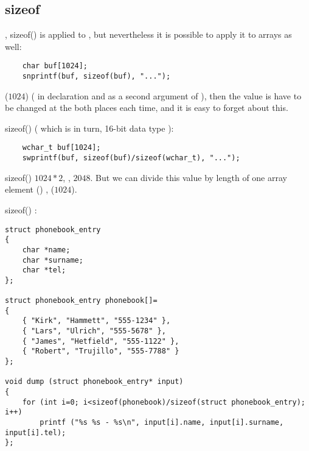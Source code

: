 ﻿\subsection{sizeof}

, sizeof() 
{is applied to }
,
{but nevertheless it is possible to apply it to arrays as well}:

\begin{lstlisting}
	char buf[1024];
	snprintf(buf, sizeof(buf), "...");
\end{lstlisting}

 ($1024$) 
(
{in  declaration and as a second argument of }),
{then the value is have to be changed at the both places each time, and it is easy to forget about this}.

 sizeof() 
  
(
{which is in turn, 16-bit data type }):

\begin{lstlisting}
	wchar_t buf[1024];
	swprintf(buf, sizeof(buf)/sizeof(wchar_t), "...");
\end{lstlisting}

sizeof()  $1024*2$, , $2048$. 
{But we can divide this value by length of one array element} ()
,
 ($1024$).

sizeof() :

\begin{lstlisting}
struct phonebook_entry
{
	char *name;
	char *surname;
	char *tel;
};

struct phonebook_entry phonebook[]=
{
	{ "Kirk", "Hammett", "555-1234" },
	{ "Lars", "Ulrich", "555-5678" },
	{ "James", "Hetfield", "555-1122" },
	{ "Robert", "Trujillo", "555-7788" }
};

void dump (struct phonebook_entry* input)
{
	for (int i=0; i<sizeof(phonebook)/sizeof(struct phonebook_entry); i++)
		printf ("%s %s - %s\n", input[i].name, input[i].surname, input[i].tel);
};
\end{lstlisting}

